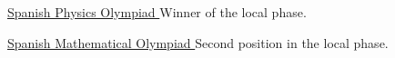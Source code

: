 \divider

\cvachievement{\faTrophy}
{\href{https://rsef.es/olimpiada-espanola-de-fisica}
  {Spanish Physics Olympiad \smallskip}}
{\small {}%
  \small{}}
Winner of the local phase.

\divider

\cvachievement{\faTrophy}
{\href{http://www.olimpiadamatematica.es/platea.pntic.mec.es/_csanchez/olimmain.html}
  {Spanish Mathematical Olympiad \smallskip}}
{\small{}%
  \small{}}
Second position in the local phase.
